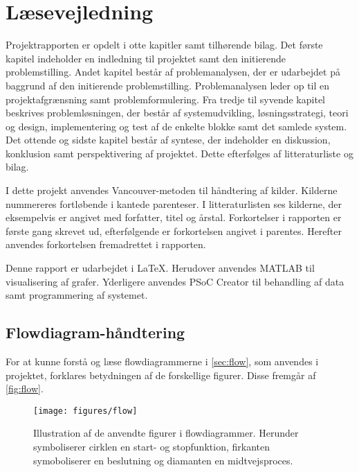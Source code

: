 \section*{Læsevejledning}
Projektrapporten er opdelt i otte kapitler samt tilhørende bilag. 
Det første kapitel indeholder en indledning til projektet samt den initierende problemstilling. 
Andet kapitel består af problemanalysen, der er udarbejdet på baggrund af den initierende problemstilling. 
Problemanalysen leder op til en projektafgrænsning samt problemformulering. 
Fra tredje til syvende kapitel beskrives problemløsningen, der består af systemudvikling, løsningsstrategi, teori og design, implementering og test af de enkelte blokke samt det samlede system. 
Det ottende og sidste kapitel består af syntese, der indeholder en diskussion, konklusion samt perspektivering af projektet. 
Dette efterfølges af litteraturliste og bilag. 

I dette projekt anvendes Vancouver-metoden til håndtering af kilder. 
Kilderne nummereres fortløbende i kantede parenteser. 
I litteraturlisten ses kilderne, der eksempelvis er angivet med forfatter, titel og årstal.  
Forkortelser i rapporten er første gang skrevet ud, efterfølgende er forkortelsen angivet i parentes. 
Herefter anvendes forkortelsen fremadrettet i rapporten.
 
Denne rapport er udarbejdet i \LaTeX. Herudover anvendes MATLAB til visualisering af grafer. Yderligere anvendes PSoC Creator til behandling af data samt programmering af systemet.  


\subsection*{Flowdiagram-håndtering} \label{sec:flowhaandtering}
For at kunne forstå og læse flowdiagrammerne i \autoref{sec:flow}, som anvendes i projektet, forklares betydningen af de forskellige figurer. Disse fremgår af \autoref{fig:flow}.

\begin{figure}[H]
\centering
\texttt{[image: figures/flow]}
\caption{Illustration af de anvendte figurer i flowdiagrammer. Herunder symboliserer cirklen en start- og stopfunktion, firkanten symoboliserer en beslutning og diamanten en midtvejsproces.}
\label{fig:flow}
\end{figure}

